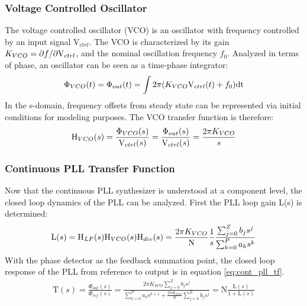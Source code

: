 		\subsubsection{Voltage Controlled Oscillator}
			The voltage controlled oscillator (VCO) is an oscillator with frequency controlled by an input signal V$_{ctrl}$. The VCO is characterized by its gain $K_{VCO} = \partial f/\partial \textnormal{V}_{ctrl}$, and the nominal oscillation frequency $f_0$. Analyzed in terms of phase, an oscillator can be seen as a time-phase integrator:
			\begin{equation}
				\Phi_{VCO}(t) = \Phi_{out}(t) = \int2\pi(K_{VCO}\textnormal{V}_{ctrl}(t) + f_0)\mathrm{dt}
			\end{equation}
			In the s-domain, frequency offsets from steady state can be represented via initial conditions for modeling purposes. The VCO transfer function is therefore:
			\begin{equation}
				\mathrm{H}_{VCO}(s) = \frac{\Phi_{VCO}(s)}{\textnormal{V}_{ctrl}(s)} = \frac{\Phi_{out}(s)}{\textnormal{V}_{ctrl}(s)} = \frac{2\pi K_{VCO}}{s}
			\end{equation}

		\subsubsection{Continuous PLL Transfer Function}\label{cont_pll_tf}
			Now that the continuous PLL synthesizer is understood at a component level, the closed loop dynamics of the PLL can be analyzed. First the PLL loop gain L(s) is determined:
			\begin{equation}
				\mathrm{L}(s) = \textnormal{H}_{LF}(s)\textnormal{H}_{VCO}(s)\textnormal{H}_{div}(s) = \frac{2\pi K_{VCO}}{\mathrm{N}}\frac{1}{s}\frac{\sum_{j=0}^Z b_js^j}{\sum_{k=0}^P a_ks^k}
			\end{equation}
			With the phase detector as the feedback summation point, the closed loop response of the PLL from reference to output is in equation \ref{eq:cont_pll_tf}.
			\begin{align} \label{eq:cont_pll_tf}
				\mathrm{T}(s) = \frac{\Phi_{out}(s)}{\Phi_{ref}(s)} = \frac{2\pi K_{VCO}\sum_{j=0}^Z b_js^j}{\sum_{k=0}^P a_ks^{k+1} + \frac{2\pi K_{VCO}}{\mathrm{N}}\sum_{j=0}^Z b_js^j} = \mathrm{N}\frac{\mathrm{L}(s)}{1 + \mathrm{L}(s)}
			\end{align}

